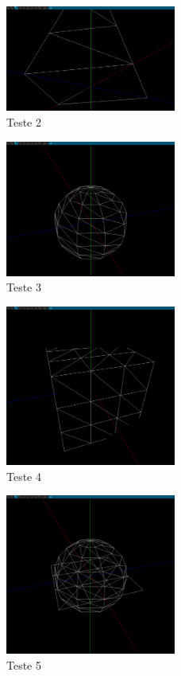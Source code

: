 \documentclass[14pt, a4 paper]{article}
\begin{document}
\begin{figure}[ht]
\centering
\includegraphics[width=0.5\textwidth]{images/2.png}
\caption{Teste 2}
\end{figure}

\begin{figure}[ht]
\centering
\includegraphics[width=0.5\textwidth]{images/3.png}
\caption{Teste 3}
\end{figure}

\begin{figure}[ht]
\centering
\includegraphics[width=0.5\textwidth]{images/4.png}
\caption{Teste 4}
\end{figure}

\begin{figure}[ht]
\centering
\includegraphics[width=0.5\textwidth]{images/5.png}
\caption{Teste 5}
\end{figure}
\end{document}
